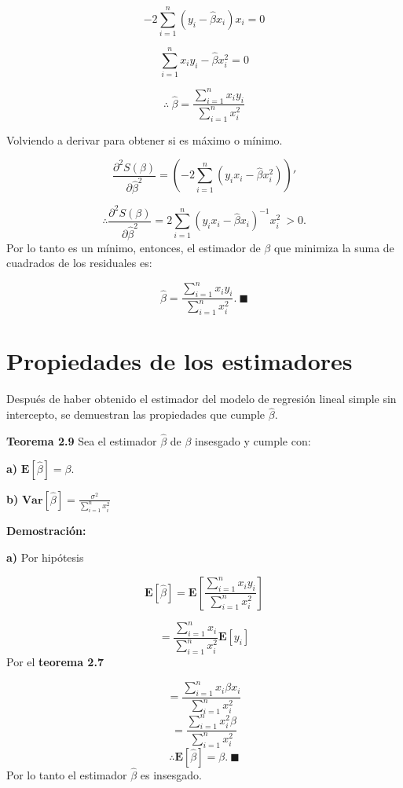 \documentclass[
  a4paper,
  oneside,
  openany]{book}
\begin{document}
\[-2\sum_{i=1}^{n}\left(y_{i}-\hat{\beta}x_{i}\right)x_{i}=0\]

\[\sum_{i=1}^{n}x_{i}y_{i}-\hat{\beta}x_{i}^2=0\]

\[\therefore \ \hat{\beta}=\frac{\sum_{i=1}^{n}x_{i}y_{i}}{\sum_{i=1}^{n}x_{i}^2}\]

Volviendo a derivar para obtener si es máximo o mínimo.

\[\frac{\partial^2 S(\beta)}{\partial \hat{\beta}^2}=\left(-2\sum_{i=1}^{n}\left(y_{i}x_{i}-\hat{\beta}x_{i}^2\right)\right)'\]

\[\therefore \frac{\partial^2 S(\beta)}{\partial \hat{\beta}^2}=2\sum_{i=1}^{n}\left(y_{i}x_{i}-\hat{\beta}x_{i}\right)^{-1}x_{i}^2 \ > 0.\]
Por lo tanto es un mínimo, entonces, el estimador de \(\beta\) que minimiza la suma de cuadrados de los residuales es:

\[\hat{\beta}=\frac{\sum_{i=1}^{n}x_{i}y_{i}}{\sum_{i=1}^{n}x_{i}^2}. \ \blacksquare\]

\hypertarget{propiedades-de-los-estimadores-1}{%
\section{Propiedades de los estimadores}\label{propiedades-de-los-estimadores-1}}

Después de haber obtenido el estimador del modelo de regresión lineal simple sin intercepto, se demuestran las propiedades que cumple \(\hat{\beta}.\)

\textbf{Teorema 2.9} Sea el estimador \(\hat{\beta}\) de \(\beta\) insesgado y cumple con:

\textbf{a)} \(\mathbf{E}\left[\hat{\beta}\right]=\beta.\)

\textbf{b)} \(\textbf{Var}\left[ \hat{\beta}\right]=\frac{\sigma^2}{\sum_{i=1}^{n}x_{i}^2}\)

\textbf{Demostración:}

\textbf{a)} Por hipótesis

\[\mathbf{E}\left[\hat{\beta}\right]=\mathbf{E}\left[\frac{\sum_{i=1}^{n}x_{i}y_{i}}{\sum_{i=1}^{n}x_{i}^2}\right]\]

\[=\frac{\sum_{i=1}^{n}x_{i}}{{\sum_{i=1}^{n}x_{i}^2}}\mathbf{E}[y_{i}]\]
Por el \textbf{teorema 2.7}

\[=\frac{\sum_{i=1}^{n}x_{i}\beta x_{i}}{{\sum_{i=1}^{n}x_{i}^2}}\]
\[=\frac{\sum_{i=1}^{n}x_{i}^2\beta}{{\sum_{i=1}^{n}x_{i}^2}}\]
\[\therefore \mathbf{E}\left[\hat{\beta}\right]=\beta. \ \blacksquare\]
Por lo tanto el estimador \(\hat{\beta}\) es insesgado.
\end{document}
